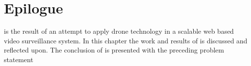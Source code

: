 \chapter{Epilogue}
\projectname{} is the result of an attempt to apply drone technology in a scalable web based video surveillance system.
In this chapter the work and results of \projectname{} is discussed and reflected upon.
The conclusion of \projectname{} is presented with the preceding problem statement






